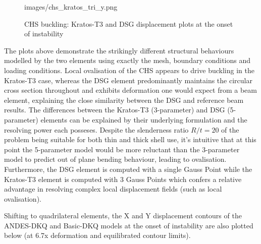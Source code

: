 \begin{figure}[H]
{		{images/chs_kratos_tri_y.png}}
	\caption{\label{chs buckling pics1}CHS buckling: Kratos-T3 and DSG displacement plots at the onset of instability}
\end{figure}

The plots above demonstrate the strikingly different structural behaviours modelled by the two elements using exactly the mesh, boundary conditions and loading conditions. Local ovalisation of the CHS appears to drive buckling in the Kratos-T3 case, whereas the DSG element predominantly maintains the circular cross section throughout and exhibits deformation one would expect from a beam element, explaining the close similarity between the DSG and reference beam results. The differences between the Kratos-T3 (3-parameter) and DSG (5-parameter) elements can be explained by their underlying formulation and the resolving power each posseses. Despite the slenderness ratio $R/t = 20$ of the problem being suitable for both thin and thick shell use, it's intuitive that at this point the 5-parameter model would be more reluctant than the 3-parameter model to predict out of plane bending behaviour, leading to ovalisation. Furthermore, the DSG element is computed with a single Gauss Point while the Kratos-T3 element is computed with 3 Gauss Points which confers a relative advantage in resolving complex local displacement fields (such as local ovalisation).

Shifting to quadrilateral elements, the X and Y displacement contours of the ANDES-DKQ and Basic-DKQ models at the onset of instability are also plotted below (at 6.7x deformation and equilibrated contour limits).

